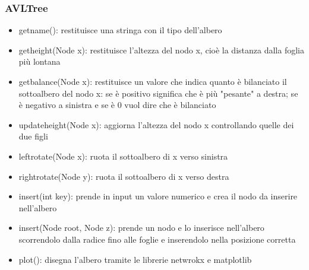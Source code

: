\documentclass[a4paper,12pt]{article}
\begin{document}
    \subsubsection{AVLTree}
    \begin{itemize}
        \item get\textunderscore name(): restituisce una stringa con il tipo dell'albero
        \item get\textunderscore height(Node x): restituisce l'altezza del nodo x, cioè la distanza dalla foglia più
        lontana
        \item get\textunderscore balance(Node x): restituisce un valore che indica quanto è bilanciato il sottoalbero
        del nodo x: se è positivo significa che è più "pesante" a destra; se è negativo a sinistra e se è 0 vuol dire
        che è bilanciato
        \item update\textunderscore height(Node x): aggiorna l'altezza del nodo x controllando quelle dei due figli
        \item left\textunderscore rotate(Node x): ruota il sottoalbero di x verso sinistra
        \item right\textunderscore rotate(Node y): ruota il sottoalbero di x verso destra
        \item insert(int key): prende in input un valore numerico e crea il nodo da inserire nell'albero
        \item \textunderscore insert(Node root, Node z): prende un nodo e lo inserisce nell'albero scorrendolo dalla radice fino
        alle foglie e inserendolo nella posizione corretta
        \item plot(): disegna l'albero tramite le librerie netwrokx e matplotlib
    \end{itemize}
\end{document}
